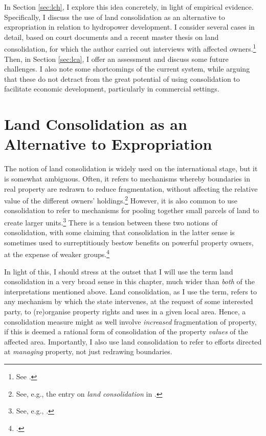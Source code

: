 {In Section \ref{sec:lch}, I explore this idea concretely, in light of empirical evidence. Specifically, I discuss the use of land consolidation as an alternative to expropriation in relation to hydropower development. I consider several cases in detail, based on court documents and a recent master thesis on land consolidation, for which the author carried out interviews with affected owners.\footnote{See \cite{stokstad11}.} Then, in Section \ref{sec:lca}, I offer an assessment and discuss some future challenges. I also note some shortcomings of the current system, while arguing that these do not detract from the great potential of using consolidation to facilitate economic development, particularly in commercial settings.
}
\section{Land Consolidation as an Alternative to Expropriation}\label{sec:lce}

The notion of land consolidation is widely used on the international stage, but it is somewhat ambiguous. Often, it refers to mechanisms whereby boundaries in real property are redrawn to reduce fragmentation, without affecting the relative value of the different owners' holdings.\footnote{See, e.g., the entry on {\it land consolidation} in \cite{mayhew09}.} However, it is also common to use consolidation to refer to mechanisms for pooling together small parcels of land to create larger units.\footnote{See, e.g., \cite{lerman06}.} There is a tension between these two notions of consolidation, with some claiming that consolidation in the latter sense is sometimes used to surreptitiously bestow benefits on powerful property owners, at the expense of weaker groups.\footcite[237-239]{lipton09}

In light of this, I should stress at the outset that I will use the term land consolidation in a very broad sense in this chapter, much wider than {\it both} of the interpretations mentioned above. Land consolidation, as I use the term, refers to any mechanism by which the state intervenes, at the request of some interested party, to (re)organise property rights and uses in a given local area. Hence, a consolidation measure might as well involve {\it increased} fragmentation of property, if this is deemed a rational form of consolidation of the property {\it values} of the affected area. Importantly, I also use land consolidation to refer to efforts directed at {\it managing} property, not just redrawing boundaries.

